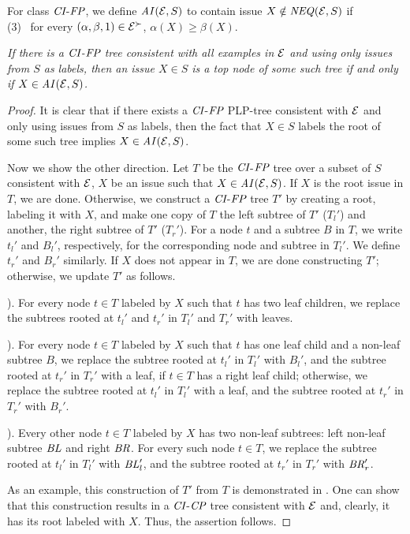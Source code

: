 For class $\textit{CI}$-$\textit{FP}$, we define $\mathit{AI}(\mathcal{E},S)$ to contain issue 
$X\notin \mathit{NEQ}(\mathcal{E},S)$ if\\
(3) \ for every $(\alpha,\beta,1) \in \mathcal{E}^\succ$,  $\alpha(X) \geq \beta(X)$.

\begin{prop}
\label{prop:2}
{\it If there is a $\textit{CI}$-$\textit{FP}$ tree consistent with all examples in $\mathcal{E}$ and 
using only issues from $S$ as labels, then an issue $X\in S$ is a top node
of some such tree if and only if $X\in \mathit{AI}(\mathcal{E},S)$.}
\end{prop}
\begin{proof}
	It is clear that if there exists a $\textit{CI}$-$\textit{FP}$ PLP-tree consistent with $\mathcal{E}$
	and only using issues from $S$ as labels, then the fact that
	$X \in S$ labels the root of some such tree implies $X \in \mathit{AI}(\mathcal{E},S)$.

	Now we show the other direction.
	Let $T$ be the $\textit{CI}$-$\textit{FP}$ tree over a subset of $S$ consistent 
	with $\mathcal{E}$,
	$X$ be an issue such that $X \in \mathit{AI}(\mathcal{E},S)$.
	If $X$ is the root issue in $T$, we are done.
	Otherwise, we construct a $\textit{CI}$-$\textit{FP}$ tree $T'$ by creating a root, 
	labeling it with $X$, and make one copy of $T$ the left subtree of $T'$
        ($T_l'$) and another, the right subtree of $T'$ ($T_r'$).
	For a node $t$ and a subtree $B$ in $T$, we write $t_l'$ and $B_l'$, 
	respectively, for the corresponding node and subtree in $T_l'$.
	We define $t_r'$ and $B_r'$ similarly. If $X$ does not appear in 
	$T$, we are done constructing $T'$; otherwise, we update $T'$ as 
	follows.

	). For every node $t\in T$ labeled by $X$ such that $t$ has two leaf children,
	we replace the subtrees rooted at $t_l'$ and $t_r'$ in $T_l'$ and $T_r'$ with leaves.

	). For every node $t \in T$ labeled by $X$ such that $t$ has one leaf child
	and a non-leaf subtree $B$, we replace the subtree rooted at $t_l'$ in $T_l'$ with $B_l'$,
	and the subtree rooted at $t_r'$ in $T_r'$ with a leaf,
	if $t \in T$ has a right leaf child; otherwise, we replace the subtree rooted at
	$t_l'$ in $T_l'$ with a leaf, and the subtree rooted at $t_r'$ in $T_r'$ with $B_r'$.

	). Every other node $t \in T$ labeled by $X$ has two non-leaf subtrees:
	left non-leaf subtree $\mathit{BL}$ and right $\mathit{BR}$.
	For every such node $t \in T$, we replace the subtree rooted at $t_l'$ in $T_l'$ with
	$\mathit{BL}_l'$, and the subtree rooted at $t_r'$ in $T_r'$ with $\mathit{BR}_r'$.

	As an example, this construction of $T'$ from $T$ is demonstrated in .
	One can show that this construction results in a $\textit{CI}$-$\textit{CP}$ tree consistent
	with $\mathcal{E}$ and, clearly, it has its root labeled with $X$.
	Thus, the assertion follows.
\end{proof}

